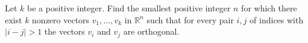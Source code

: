 \documentclass{article}
\begin{document}
\setlength{\parindent}{0pt}
Let \(\displaystyle k\) be a positive integer. Find the smallest positive integer \(\displaystyle n\) for which there exist \(\displaystyle k\) nonzero vectors \(\displaystyle v_1,\ldots,v_k\) in \(\displaystyle \mathbb R^n\) such that for every pair \(\displaystyle i,j\) of indices with \(\displaystyle |i-j|>1\) the vectors \(\displaystyle v_i\) and \(\displaystyle v_j\) are orthogonal.
\end{document}

